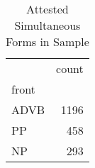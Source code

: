 \begin{table}[htbp!]
\centering
\caption{Attested Simultaneous Forms in Sample}
\label{table:sim_phtype}
\begin{tabular}{lr}
\toprule
{} &  count \\
front &        \\
\midrule
ADVB  &   1196 \\
PP    &    458 \\
NP    &    293 \\
\bottomrule
\end{tabular}
\end{table}
